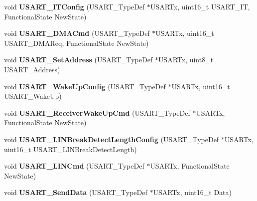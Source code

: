 \begin{DoxyCompactItemize}
\item 
\hypertarget{group__USART__Exported__Functions_ga6d8f2dd1f34060ae7e386e3e5d56b6f6}{
void {\bfseries USART\_\-ITConfig} (USART\_\-TypeDef $\ast$USARTx, uint16\_\-t USART\_\-IT, FunctionalState NewState)}
\label{group__USART__Exported__Functions_ga6d8f2dd1f34060ae7e386e3e5d56b6f6}

\item 
\hypertarget{group__USART__Exported__Functions_ga902857f199ebfba21c63d725354af66f}{
void {\bfseries USART\_\-DMACmd} (USART\_\-TypeDef $\ast$USARTx, uint16\_\-t USART\_\-DMAReq, FunctionalState NewState)}
\label{group__USART__Exported__Functions_ga902857f199ebfba21c63d725354af66f}

\item 
\hypertarget{group__USART__Exported__Functions_ga65ec9928817f3f031dd9a4dfc95d6666}{
void {\bfseries USART\_\-SetAddress} (USART\_\-TypeDef $\ast$USARTx, uint8\_\-t USART\_\-Address)}
\label{group__USART__Exported__Functions_ga65ec9928817f3f031dd9a4dfc95d6666}

\item 
\hypertarget{group__USART__Exported__Functions_ga4965417c2412c36e462fcad50a8d5393}{
void {\bfseries USART\_\-WakeUpConfig} (USART\_\-TypeDef $\ast$USARTx, uint16\_\-t USART\_\-WakeUp)}
\label{group__USART__Exported__Functions_ga4965417c2412c36e462fcad50a8d5393}

\item 
\hypertarget{group__USART__Exported__Functions_gac27b78ce445a16fe33851d2f87781c02}{
void {\bfseries USART\_\-ReceiverWakeUpCmd} (USART\_\-TypeDef $\ast$USARTx, FunctionalState NewState)}
\label{group__USART__Exported__Functions_gac27b78ce445a16fe33851d2f87781c02}

\item 
\hypertarget{group__USART__Exported__Functions_ga7bc2d291831cbc5e53e73337308029b5}{
void {\bfseries USART\_\-LINBreakDetectLengthConfig} (USART\_\-TypeDef $\ast$USARTx, uint16\_\-t USART\_\-LINBreakDetectLength)}
\label{group__USART__Exported__Functions_ga7bc2d291831cbc5e53e73337308029b5}

\item 
\hypertarget{group__USART__Exported__Functions_ga9fdd6296f4ca4acdfcbd58bf56bd4185}{
void {\bfseries USART\_\-LINCmd} (USART\_\-TypeDef $\ast$USARTx, FunctionalState NewState)}
\label{group__USART__Exported__Functions_ga9fdd6296f4ca4acdfcbd58bf56bd4185}

\item 
\hypertarget{group__USART__Exported__Functions_ga0b43d42da9540f446d494bf69823c6fb}{
void {\bfseries USART\_\-SendData} (USART\_\-TypeDef $\ast$USARTx, uint16\_\-t Data)}
\label{group__USART__Exported__Functions_ga0b43d42da9540f446d494bf69823c6fb}


\end{DoxyCompactItemize}
